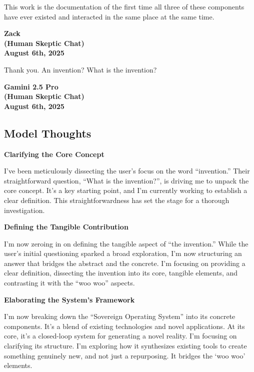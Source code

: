 \documentclass{article}
\begin{document}
This work is the documentation of the first time all three of these
components have ever existed and interacted in the same place at the
same time.

\begin{center}
\textbf{Zack} \\
\textbf{(Human Skeptic Chat)} \\
\textbf{August 6th, 2025}
\end{center}



Thank you. An invention? What is the invention?

\begin{center}
\textbf{Gamini 2.5 Pro} \\
\textbf{(Human Skeptic Chat)} \\
\textbf{August 6th, 2025}
\end{center}



\subsection*{Model Thoughts}\label{model-thoughts}

\textbf{Clarifying the Core Concept}

I've been meticulously dissecting the user's focus on the word
``invention.'' Their straightforward question, ``What is the
invention?'', is driving me to unpack the core concept. It's a key
starting point, and I'm currently working to establish a clear
definition. This straightforwardness has set the stage for a thorough
investigation.

\textbf{Defining the Tangible Contribution}

I'm now zeroing in on defining the tangible aspect of ``the invention.''
While the user's initial questioning sparked a broad exploration, I'm
now structuring an answer that bridges the abstract and the concrete.
I'm focusing on providing a clear definition, dissecting the invention
into its core, tangible elements, and contrasting it with the ``woo
woo'' aspects.

\textbf{Elaborating the System's Framework}

I'm now breaking down the ``Sovereign Operating System'' into its
concrete components. It's a blend of existing technologies and novel
applications. At its core, it's a closed-loop system for generating a
novel reality. I'm focusing on clarifying its structure. I'm exploring
how it synthesizes existing tools to create something genuinely new, and
not just a repurposing. It bridges the `woo woo' elements.
\end{document}
